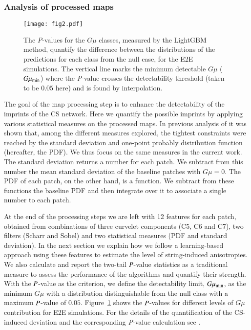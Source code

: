 \documentclass[fleqn,usenatbib]{mnras}
\begin{document}
\subsubsection{Analysis of  processed maps}
 \begin{figure}
	\texttt{[image: fig2.pdf]}
	\caption{The {\it P}-values for the $G\mu$ classes, measured by the LightGBM method, quantify the difference between  the distributions of the predictions for each class from the null case, for the E2E simulations. The vertical line marks the minimum detectable $G\mu$   ($G\mu_{\rm min}$) where the {\it P}-value crosses the detectability threshold (taken to be $0.05$ here) and is found by interpolation.}
	\label{fig:pvallgbm}
\end{figure}
The goal of the map processing step is to enhance the detectability of the imprints of the CS network. 
Here we quantify the possible imprints by applying various statistical measures on the processed maps. 
In previous analysis of \cite{vaf17} it was shown that, among the different measures explored, 
the tightest constraints were reached by  the  standard deviation and one-point probably distribution function (hereafter, the PDF).
We thus focus on the same measures in the current work.
The standard deviation returns a number for each patch.  We subtract from this number the mean standard deviation of the  baseline patches with $G\mu = 0$.
The PDF of each patch, on the other hand, is a function. We subtract from these functions the baseline PDF and then integrate over it to associate a single number to each patch. 

At the end of the processing steps we are left with 12 features for each patch, obtained from combinations of three curvelet components (C5, C6 and C7), two filters (Scharr and Sobel) and two statistical measures (PDF and standard deviation). 
%
In the next section we explain how we follow a learning-based approach using these features to estimate the level of string-induced anisotropies.  
We also calculate and report  the two-tail ${\it P}$-value statistics as a traditional measure to assess  the performance of the algorithms and quantify their strength. 
With the ${\it P}$-value as the criterion, we define the detectability limit, $G\mu_{\rm min}$, as the 
minimum $G\mu$ with a distribution distinguishable from the null class with a maximum ${\it P}$-value of $0.05$. Figure~\ref{fig:pvallgbm} shows the ${\it P}$-values for different levels of $G\mu$ contribution for E2E simulations. 
For the details of the quantification of the CS-induced deviation and the corresponding {\it P}-value calculation see \cite{vaf17}.
\end{document}
